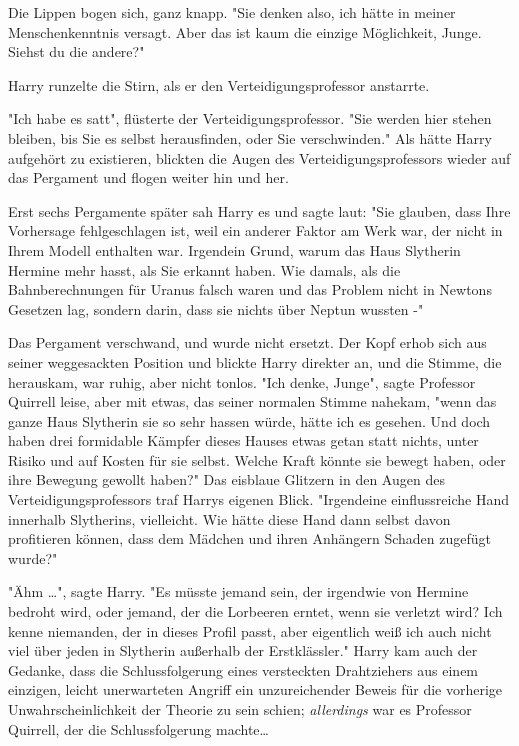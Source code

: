 {Die Lippen bogen sich, ganz knapp. "Sie denken also, ich hätte in meiner Menschenkenntnis versagt. Aber das ist kaum die einzige Möglichkeit, Junge. Siehst du die andere?"

Harry runzelte die Stirn, als er den Verteidigungsprofessor anstarrte.

"Ich habe es satt", flüsterte der Verteidigungsprofessor. "Sie werden hier stehen bleiben, bis Sie es selbst herausfinden, oder Sie verschwinden." Als hätte Harry aufgehört zu existieren, blickten die Augen des Verteidigungsprofessors wieder auf das Pergament und flogen weiter hin und her.

Erst sechs Pergamente später sah Harry es und sagte laut: "Sie glauben, dass Ihre Vorhersage fehlgeschlagen ist, weil ein anderer Faktor am Werk war, der nicht in Ihrem Modell enthalten war. Irgendein Grund, warum das Haus Slytherin Hermine mehr hasst, als Sie erkannt haben. Wie damals, als die Bahnberechnungen für Uranus falsch waren und das Problem nicht in Newtons Gesetzen lag, sondern darin, dass sie nichts über Neptun wussten -"

Das Pergament verschwand, und wurde nicht ersetzt. Der Kopf erhob sich aus seiner weggesackten Position und blickte Harry direkter an, und die Stimme, die herauskam, war ruhig, aber nicht tonlos. "Ich denke, Junge", sagte Professor Quirrell leise, aber mit etwas, das seiner normalen Stimme nahekam, "wenn das ganze Haus Slytherin sie so sehr hassen würde, hätte ich es gesehen. Und doch haben drei formidable Kämpfer dieses Hauses etwas getan statt nichts, unter Risiko und auf Kosten für sie selbst. Welche Kraft könnte sie bewegt haben, oder ihre Bewegung gewollt haben?" Das eisblaue Glitzern in den Augen des Verteidigungsprofessors traf Harrys eigenen Blick. "Irgendeine einflussreiche Hand innerhalb Slytherins, vielleicht. Wie hätte diese Hand dann selbst davon profitieren können, dass dem Mädchen und ihren Anhängern Schaden zugefügt wurde?"

"Ähm …", sagte Harry. "Es müsste jemand sein, der irgendwie von Hermine bedroht wird, oder jemand, der die Lorbeeren erntet, wenn sie verletzt wird? Ich kenne niemanden, der in dieses Profil passt, aber eigentlich weiß ich auch nicht viel über jeden in Slytherin außerhalb der Erstklässler." Harry kam auch der Gedanke, dass die Schlussfolgerung eines versteckten Drahtziehers aus einem einzigen, leicht unerwarteten Angriff ein unzureichender Beweis für die vorherige Unwahrscheinlichkeit der Theorie zu sein schien; \emph{allerdings} war es Professor Quirrell, der die Schlussfolgerung machte…

}
